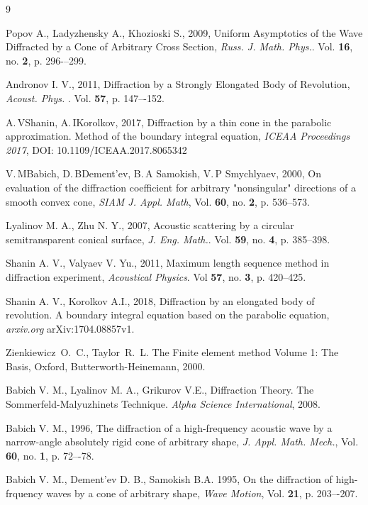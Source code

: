 \documentclass{procDDs}
\begin{document}
\begin {thebibliography}{9}
	
 Popov A., Ladyzhensky A., Khozioski S., 2009, Uniform Asymptotics of the Wave Diffracted by a Cone of Arbitrary Cross Section,  \emph{Russ. J. Math. Phys.}. Vol. \textbf{16}, no. \textbf{2}, p. 296-–299.
	
 Andronov I. V., 2011, Diffraction by a Strongly Elongated Body of Revolution, \emph{Acoust. Phys.} . Vol. \textbf{57}, p. 147–-152.
	
 A.\,V\;Shanin, A.\,I\;Korolkov, 2017,  Diffraction by a thin cone in the parabolic approximation. Method of the boundary integral equation, \emph{ICEAA Proceedings 2017}, DOI: 10.1109/ICEAA.2017.8065342
	
 V.\,M\;Babich, D.\,B\;Dement'ev, B.\,A\; Samokish, V.\,P\; Smychlyaev, 2000, On evaluation of the diffraction coefficient for arbitrary "nonsingular" directions of a smooth convex cone, \emph{SIAM J. Appl. Math}, Vol. \textbf{60}, no. \textbf{2}, p. 536--573.
	
 Lyalinov M. A., Zhu N. Y., 2007, Acoustic scattering by a circular semitransparent conical surface, \emph{J. Eng. Math.}. Vol. \textbf{59}, no. \textbf{4}, p. 385--398.
	
 Shanin A. V., Valyaev V. Yu., 2011, Maximum length sequence method in diffraction experiment, \emph{Acoustical Physics}. Vol \textbf{57}, no. \textbf{3}, p. 420--425.

 Shanin A. V., Korolkov A.I., 2018, Diffraction by an elongated body of revolution. A boundary integral equation based on the parabolic equation, \emph{arxiv.org} arXiv:1704.08857v1.

 Zienkiewicz~O.~C., Taylor~R.~L. The Finite element method Volume 1: The Basis,  Oxford, Butterworth-Heinemann, 2000.

 Babich V. M., Lyalinov M. A., Grikurov V.E., Diffraction Theory. The Sommerfeld-Malyuzhinets Technique. \emph{Alpha Science International}, 2008.

 Babich V. M., 1996, The diffraction of a high-frequency acoustic wave by a narrow-angle absolutely rigid cone of arbitrary shape, \emph{J. Appl. Math. Mech.}, Vol. \textbf{60}, no. \textbf{1}, p. 72–-78.

 Babich V. M., Dement'ev D. B., Samokish B.A. 1995, On the diffraction of high-frquency waves by a cone of arbitrary shape, \emph{Wave Motion}, Vol. \textbf{21}, p. 203–-207.



\end{thebibliography}
\end{document}
